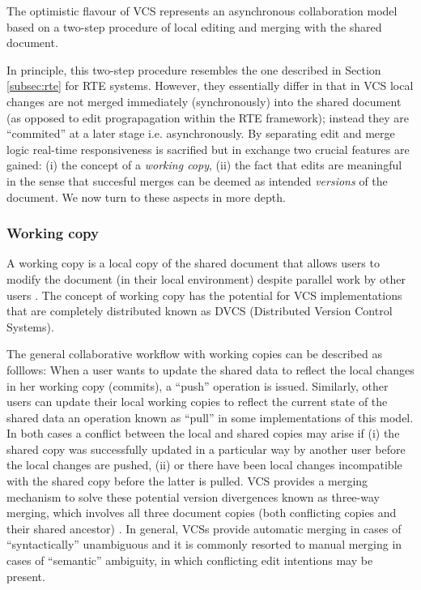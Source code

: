 \documentclass{sig-alternate}
\begin{document}
The optimistic flavour of VCS represents an asynchronous collaboration model based on a
two-step procedure of local editing and merging with the shared document.

In principle, this two-step procedure resembles the one described in Section \ref{subsec:rte}
for RTE systems. However, they essentially differ in that in VCS local changes are not merged
immediately (synchronously) into the shared document (as opposed to edit prograpagation
within the RTE framework); instead they are ``commited'' at a later stage
\textemdash i.e. asynchronously.
By separating edit and merge logic real-time responsiveness is
sacrified but in exchange two crucial features are gained: (i) the concept of a
\textit{working copy}, (ii) the fact that edits are meaningful \textemdash in the sense
that succesful merges can be deemed as intended \textit{versions} of the document.
We now turn to these aspects in more depth.

\subsubsection{Working copy}\label{subsec:workingcopy}
A working copy is a local copy of the shared document that allows users
to modify the document (in their local environment) despite parallel work by other users
\cite{Collins-Sussman}. The concept of working copy has the potential for VCS implementations
that are completely distributed \textemdash known as DVCS (Distributed Version Control Systems).

The general collaborative workflow with working copies can be described as folllows:
When a user wants to update the shared data to reflect the local changes in her working copy
(commits), a ``push'' operation is issued. Similarly, other users can update their local
working copies to reflect the current state of the shared data \textemdash an operation
known as ``pull'' in some implementations of this model.
In both cases a conflict between the local and shared copies may arise if (i) the shared
copy was successfully updated in a particular way by another user before the local changes
are pushed, (ii) or there have been local changes incompatible with the shared copy before
the latter is pulled.
VCS provides a merging mechanism to solve these potential version divergences known as
three-way merging, which involves all three document copies (both conflicting copies and their
shared ancestor) \cite{Altmanninger2009}. In general, VCSs provide automatic merging in cases
of ``syntactically'' unambiguous and it is commonly resorted to manual merging in cases
of ``semantic'' ambiguity, in which conflicting edit intentions may be present.%
\end{document}
